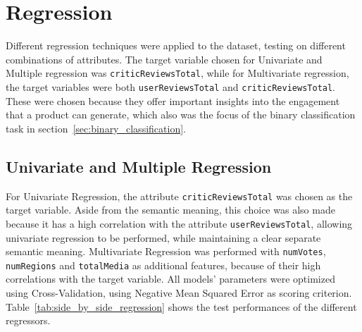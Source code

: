 \chapter{Regression}
\label{ch:capitolo4}
Different regression techniques were applied to the dataset, testing
on different combinations of attributes. The target variable chosen for
Univariate and Multiple regression was \texttt{criticReviewsTotal}, while
for Multivariate regression, the target variables were both
\texttt{userReviewsTotal} and \texttt{criticReviewsTotal}.
These were chosen because they offer important insights into the engagement
that a product can generate, which also was the focus of the binary
classification task in section~\ref{sec:binary_classification}.


\section{Univariate and Multiple Regression}
For Univariate Regression, the attribute
\texttt{criticReviewsTotal} was chosen
as the target variable. Aside from the semantic meaning, this choice was also made
because it has a high correlation
with the attribute \texttt{userReviewsTotal}, allowing univariate regression
to be performed, while maintaining a clear separate semantic meaning.
Multivariate Regression was performed with \texttt{numVotes}, \texttt{numRegions} and
\texttt{totalMedia} as additional features, because of their high correlations with the target variable.
All models' parameters
were optimized using Cross-Validation, using Negative Mean Squared Error as scoring criterion.
Table~\ref{tab:side_by_side_regression} shows the test performances of the different regressors.
